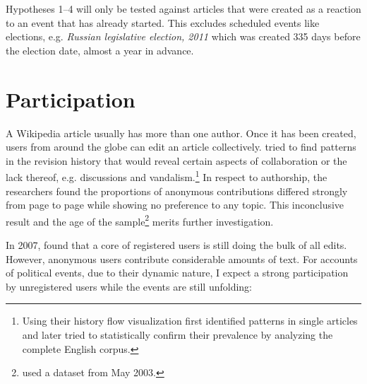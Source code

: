 
Hypotheses 1--4 will only be tested against articles that were created as a reaction to an event that has already started. 
This excludes scheduled events like elections, e.g. \emph{Russian legislative election, 2011} which was created 335 days before the election date, almost a year in advance.


\section{Participation}\label{sec:participation}

A Wikipedia article usually has more than one author.
Once it has been created, users from around the globe can edit an article collectively.
\textcite{viegas2004history} tried to find patterns in the revision history that would reveal certain aspects of collaboration or the lack thereof, e.g. discussions and vandalism.\footnote{Using their history flow visualization \textcite{viegas2004history} first identified patterns in single articles and later tried to statistically confirm their prevalence by analyzing the complete English corpus.} 
In respect to authorship, the researchers found the proportions of anonymous contributions differed strongly from page to page while showing no preference to any topic.
This inconclusive result and the age of the sample\footnote{\textcite{viegas2004history} used a dataset from May 2003.} merits further investigation. 

In 2007, \textcite{kittur2007power} found that a core of registered users is still doing the bulk of all edits.
However, anonymous users contribute considerable amounts of text. 
For accounts of political events, due to their dynamic nature, I expect a strong participation by unregistered users while the events are still unfolding:



